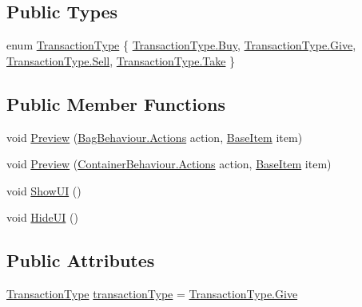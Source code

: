 \subsection*{Public Types}
\begin{DoxyCompactItemize}
\item 
enum \mbox{\hyperlink{class_transfer_u_i_acb894008318cb07b7144beb2d6d81606}{Transaction\+Type}} \{ \mbox{\hyperlink{class_transfer_u_i_acb894008318cb07b7144beb2d6d81606a831a28f1e8df07c553fcd59546465d13}{Transaction\+Type.\+Buy}}, 
\mbox{\hyperlink{class_transfer_u_i_acb894008318cb07b7144beb2d6d81606a2f355d9fa7accc561d3edc335de2fbcf}{Transaction\+Type.\+Give}}, 
\mbox{\hyperlink{class_transfer_u_i_acb894008318cb07b7144beb2d6d81606a3068c5a98c003498f1fec0c489212e8b}{Transaction\+Type.\+Sell}}, 
\mbox{\hyperlink{class_transfer_u_i_acb894008318cb07b7144beb2d6d81606aa1df5b634fdadddf5a2170304c556b90}{Transaction\+Type.\+Take}}
 \}
\end{DoxyCompactItemize}
\subsection*{Public Member Functions}
\begin{DoxyCompactItemize}
\item 
void \mbox{\hyperlink{class_transfer_u_i_a9d2e7c3708193e3d51fe8539f9c41a75}{Preview}} (\mbox{\hyperlink{class_bag_behaviour_aeafbbbda3c9a34d1a73647a8b274788c}{Bag\+Behaviour.\+Actions}} action, \mbox{\hyperlink{class_base_item}{Base\+Item}} item)
\item 
void \mbox{\hyperlink{class_transfer_u_i_a52bd586cae27d6570e207d856457a116}{Preview}} (\mbox{\hyperlink{class_container_behaviour_a8ad6b6c9b34c2e0abdaaf0627f87b036}{Container\+Behaviour.\+Actions}} action, \mbox{\hyperlink{class_base_item}{Base\+Item}} item)
\item 
void \mbox{\hyperlink{class_transfer_u_i_acb1dacb30d206743a569f8dc6bf9e5e4}{Show\+UI}} ()
\item 
void \mbox{\hyperlink{class_transfer_u_i_a5c4b5956098b374e40ea084d7fbe7739}{Hide\+UI}} ()
\end{DoxyCompactItemize}
\subsection*{Public Attributes}
\begin{DoxyCompactItemize}
\item 
\mbox{\hyperlink{class_transfer_u_i_acb894008318cb07b7144beb2d6d81606}{Transaction\+Type}} \mbox{\hyperlink{class_transfer_u_i_a7a235277eb0406680963562b2088d136}{transaction\+Type}} = \mbox{\hyperlink{class_transfer_u_i_acb894008318cb07b7144beb2d6d81606a2f355d9fa7accc561d3edc335de2fbcf}{Transaction\+Type.\+Give}}
\end{DoxyCompactItemize}


